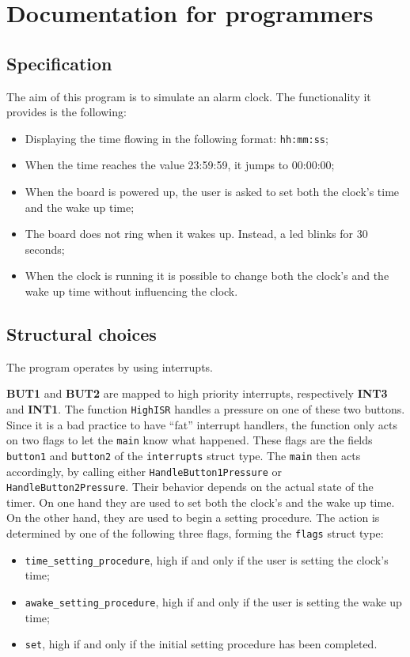 \section{Documentation for programmers}
\subsection{Specification}
The aim of this program is to simulate an alarm clock. The functionality it provides is the following:
\begin{itemize}
	\item Displaying the time flowing in the following format: \texttt{hh:mm:ss};
	\item When the time reaches the value 23:59:59, it jumps to 00:00:00;
	\item When the board is powered up, the user is asked to set both the clock's time and the wake up time;
	\item The board does not ring when it wakes up. Instead, a led blinks for 30 seconds;
	\item When the clock is running it is possible to change both the clock's and the wake up time without influencing the clock.
\end{itemize}

\subsection{Structural choices}
The program operates by using interrupts. 

\textbf{BUT1} and \textbf{BUT2} are mapped to high priority interrupts, respectively \textbf{INT3} and \textbf{INT1}. The function \texttt{HighISR} handles a pressure on one of these two buttons. Since it is a bad practice to have ``fat'' interrupt handlers, the function only acts on two flags to let the \texttt{main} know what happened. These flags are the fields \texttt{button1} and \texttt{button2} of the \texttt{interrupts} struct type. The \texttt{main} then acts accordingly, by calling either \texttt{HandleButton1Pressure} or \\\texttt{HandleButton2Pressure}. Their behavior depends on the actual state of the timer. On one hand they are used to set both the clock's and the wake up time. On the other hand, they are used to begin a setting procedure. The action is determined by one of the following three flags, forming the \texttt{flags} struct type:
\begin{itemize}
	\item \texttt{time\_setting\_procedure}, high if and only if the user is setting the clock's time;
	\item \texttt{awake\_setting\_procedure}, high if and only if the user is setting the wake up time;
	\item \texttt{set}, high if and only if the initial setting procedure has been completed.
\end{itemize}

